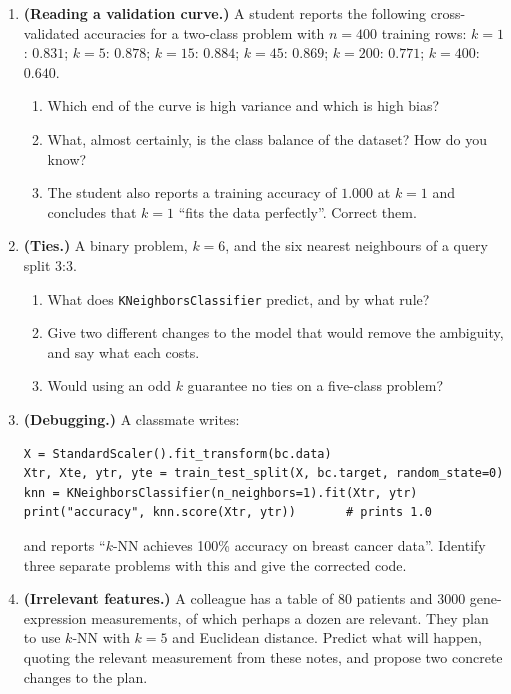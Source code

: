 \documentclass[11pt]{article}
\begin{document}
\begin{enumerate}[leftmargin=*, itemsep=0.55em]
\item \textbf{(Reading a validation curve.)} A student reports the following
  cross-validated accuracies for a two-class problem with $n = 400$ training
  rows: $k=1$: $0.831$; $k=5$: $0.878$; $k=15$: $0.884$; $k=45$: $0.869$;
  $k=200$: $0.771$; $k=400$: $0.640$.
  \begin{enumerate}[label=(\alph*)]
    \item Which end of the curve is high variance and which is high bias?
    \item What, almost certainly, is the class balance of the dataset? How do
      you know?
    \item The student also reports a training accuracy of $1.000$ at $k=1$ and
      concludes that $k=1$ ``fits the data perfectly''. Correct them.
  \end{enumerate}

\item \textbf{(Ties.)} A binary problem, $k = 6$, and the six nearest
  neighbours of a query split $3$:$3$.
  \begin{enumerate}[label=(\alph*)]
    \item What does \texttt{KNeighborsClassifier} predict, and by what rule?
    \item Give two different changes to the model that would remove the
      ambiguity, and say what each costs.
    \item Would using an odd $k$ guarantee no ties on a five-class problem?
  \end{enumerate}

\item \textbf{(Debugging.)} A classmate writes:

\begin{lstlisting}
X = StandardScaler().fit_transform(bc.data)
Xtr, Xte, ytr, yte = train_test_split(X, bc.target, random_state=0)
knn = KNeighborsClassifier(n_neighbors=1).fit(Xtr, ytr)
print("accuracy", knn.score(Xtr, ytr))       # prints 1.0
\end{lstlisting}

  and reports ``$k$-NN achieves 100\% accuracy on breast cancer data''. %
  Identify three separate problems with this and give the corrected code.

\item \textbf{(Irrelevant features.)} A colleague has a table of $80$ patients
  and $3000$ gene-expression measurements, of which perhaps a dozen are
  relevant. They plan to use $k$-NN with $k=5$ and Euclidean distance.
  Predict what will happen, quoting the relevant measurement from these notes,
  and propose two concrete changes to the plan.

\end{enumerate}
\end{document}
